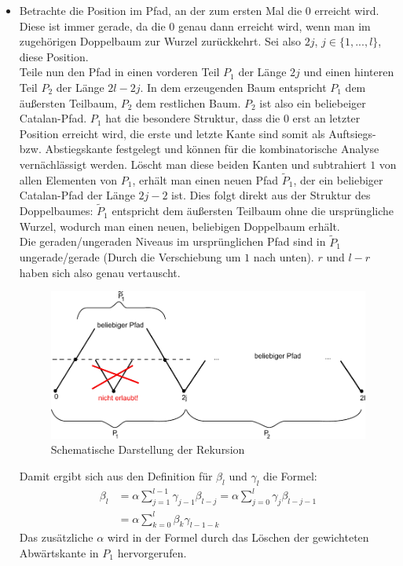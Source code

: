 \documentclass[a4paper, 11pt]{scrreprt}
\begin{document}
\begin{itemize}
\item
Betrachte die Position im Pfad, an der zum ersten Mal die \(0\) erreicht wird. Diese ist immer gerade, da die \(0\) genau dann erreicht wird, wenn man im zugehörigen Doppelbaum zur Wurzel zurückkehrt. Sei also \(2j\), \(j\in\{1,...,l\}\), diese Position. \\
Teile nun den Pfad in einen vorderen Teil \(P_1\) der Länge \(2j\) und einen hinteren Teil \(P_2\) der Länge \(2l-2j\). In dem erzeugenden Baum entspricht \(P_1\) dem äußersten Teilbaum, \(P_2\) dem restlichen Baum. \(P_2\) ist also ein beliebeiger Catalan-Pfad. \(P_1\) hat die besondere Struktur, dass die \(0\) erst an letzter Position erreicht wird, die erste und letzte Kante sind somit als Auftsiegs- bzw. Abstiegskante festgelegt und können für die kombinatorische Analyse vernächlässigt werden. Löscht man diese beiden Kanten und subtrahiert \(1\) von allen Elementen von \(P_1\), erhält man einen neuen Pfad \(\tilde{P}_1\), der ein beliebiger Catalan-Pfad der Länge \(2j-2\) ist. Dies folgt direkt aus der Struktur des Doppelbaumes: \(\tilde{P}_1\) entspricht dem äußersten Teilbaum ohne die ursprüngliche Wurzel, wodurch man einen neuen, beliebigen Doppelbaum erhält. \\
Die geraden/ungeraden Niveaus im ursprünglichen Pfad sind in \(\tilde{P}_1\) ungerade/gerade (Durch die Verschiebung um \(1\) nach unten). \(r\) und \(l-r\) haben sich also genau vertauscht.
\begin{figure}[htpb]
	\centering
	\includegraphics[width=1.00\textwidth]{Rekursion-Visualisierung.pdf}
	\caption{Schematische Darstellung der Rekursion}
\end{figure}
Damit ergibt sich aus den Definition für \(\beta_l\) und \(\gamma_l\) die Formel:
\begin{equation}
	\begin{split}
		\beta_l &= \alpha\sum_{j=1}^{l-1}\gamma_{j-1}\beta_{l-j} = \alpha\sum_{j=0}^l \gamma_j\beta_{l-j-1}\\
		&=\alpha\sum_{k=0}^l \beta_k\gamma_{l-1-k}
	\end{split}
\end{equation}
Das zusätzliche \(\alpha\) wird in der Formel durch das Löschen der gewichteten Abwärtskante in \(P_1\) hervorgerufen.\\



\end{itemize}
\end{document}
